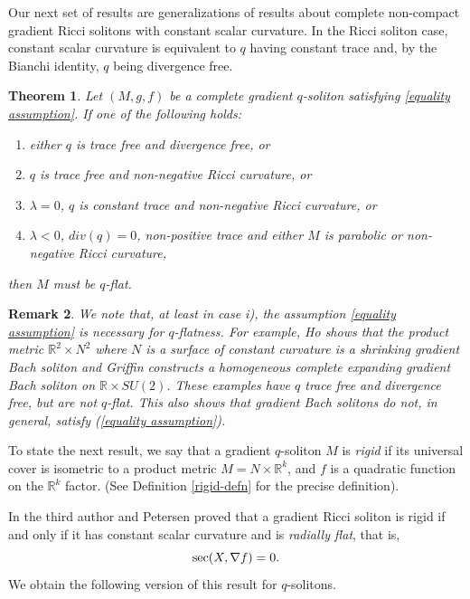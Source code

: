 \documentclass{amsart}
\theoremstyle{plain}
\newtheorem{theorem}{\bf Theorem}[section]
\newtheorem{remark}[theorem]{Remark}
\numberwithin{equation}{section}
\begin{document}
 Our next set of results are generalizations of results about complete non-compact gradient Ricci solitons with constant scalar curvature.  In the Ricci soliton case, constant scalar curvature is equivalent to $q$ having constant trace and, by the Bianchi identity, $q$ being divergence free. 

 
\begin{theorem}\label{thm02}
Let $(M,g,f)$ be a complete gradient $q$-soliton satisfying \eqref{equality assumption}. If one of the following holds:
\begin{enumerate}
    \item [i)] either $q$ is trace free and divergence free, or
    \item [ii)] $q$ is trace free and non-negative Ricci curvature, or
    \item [iii)] $\lambda=0$, $q$ is constant trace and non-negative Ricci curvature, or
    \item[iv)] $\lambda<0$, $div(q)=0$, non-positive trace and either $M$ is parabolic or non-negative Ricci curvature,
\end{enumerate}
then $M$ must be $q$-flat.
\end{theorem}
\begin{remark}
{\em 
We note that, at least in case i), the assumption \eqref{equality assumption} is necessary for $q$-flatness.  For example, Ho \cite{Ho} shows that the product metric $\mathbb{R}^2 \times N^2$ where $N$ is a surface of constant curvature is a shrinking gradient Bach soliton and Griffin constructs a homogeneous complete expanding gradient Bach soliton on $\mathbb{R} \times SU(2)$.   These examples have $q$ trace free and divergence free, but are  not $q$-flat.  This also shows that gradient Bach solitons do not, in general, satisfy (\ref{equality assumption}). }
\end{remark}

To state the next result, we say that a gradient $q$-soliton $M$ is {\em rigid} if its universal cover is isometric to a product metric   $M=N\times \mathbb{R}^k$,  and $f$ is a quadratic function on the $\mathbb{R}^k$ factor. (See Definition \ref{rigid-defn} for the precise definition). 

In \cite[Theorem 1.2]{WP} the third author and Petersen proved that a gradient Ricci soliton is rigid if and only if it has constant scalar curvature and is {\em radially flat}, that is,
$${\rm sec}(X,\nabla f)=0.$$
We obtain the following version of this result for $q$-solitons.
\end{document}
